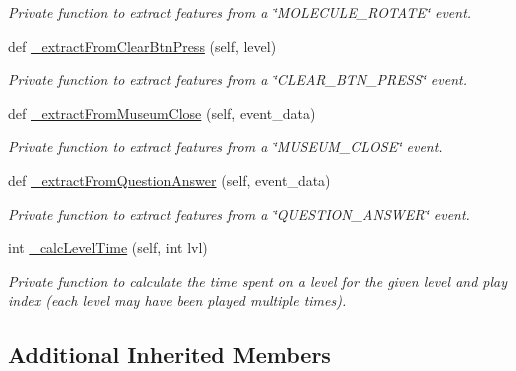 \begin{DoxyCompactItemize}
\begin{DoxyCompactList}\small\item\em Private function to extract features from a \char`\"{}\+M\+O\+L\+E\+C\+U\+L\+E\+\_\+\+R\+O\+T\+A\+T\+E\char`\"{} event. \end{DoxyCompactList}\item 
def \mbox{\hyperlink{classfeature__extractors_1_1_crystal_extractor_1_1_crystal_extractor_ab17cf3538783740964e3befadd1d089d}{\+\_\+extract\+From\+Clear\+Btn\+Press}} (self, level)
\begin{DoxyCompactList}\small\item\em Private function to extract features from a \char`\"{}\+C\+L\+E\+A\+R\+\_\+\+B\+T\+N\+\_\+\+P\+R\+E\+S\+S\char`\"{} event. \end{DoxyCompactList}\item 
def \mbox{\hyperlink{classfeature__extractors_1_1_crystal_extractor_1_1_crystal_extractor_a6663edde4eaa797cbd1d46c87aec0b36}{\+\_\+extract\+From\+Museum\+Close}} (self, event\+\_\+data)
\begin{DoxyCompactList}\small\item\em Private function to extract features from a \char`\"{}\+M\+U\+S\+E\+U\+M\+\_\+\+C\+L\+O\+S\+E\char`\"{} event. \end{DoxyCompactList}\item 
def \mbox{\hyperlink{classfeature__extractors_1_1_crystal_extractor_1_1_crystal_extractor_aad9c54b2a84c7179f7263b1eb586830e}{\+\_\+extract\+From\+Question\+Answer}} (self, event\+\_\+data)
\begin{DoxyCompactList}\small\item\em Private function to extract features from a \char`\"{}\+Q\+U\+E\+S\+T\+I\+O\+N\+\_\+\+A\+N\+S\+W\+E\+R\char`\"{} event. \end{DoxyCompactList}\item 
int \mbox{\hyperlink{classfeature__extractors_1_1_crystal_extractor_1_1_crystal_extractor_a88a5fe53cddfcaed7008e4f40fc09876}{\+\_\+calc\+Level\+Time}} (self, int lvl)
\begin{DoxyCompactList}\small\item\em Private function to calculate the time spent on a level for the given level and play index (each level may have been played multiple times). \end{DoxyCompactList}\end{DoxyCompactItemize}
\subsection*{Additional Inherited Members}


